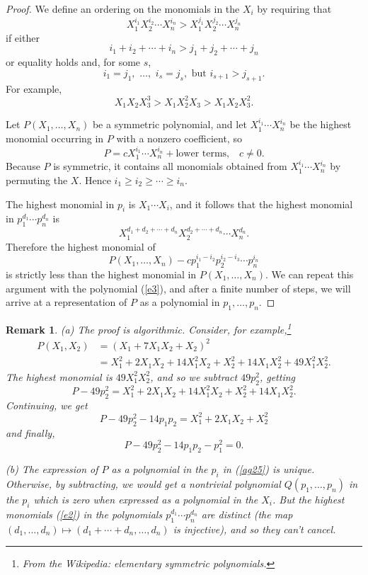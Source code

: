 \documentclass[a4paper,11pt,final,openany]{memoir}
\newtheorem{remark}[X]{Remark}
\theoremstyle{nonumberplain}
\newtheorem{proof}{Proof.}
\begin{document}
\begin{proof}
We define an ordering on the monomials in the $X_{i}$ by requiring that
\[
X_{1}^{i_{1}}X_{2}^{i_{2}}\cdots X_{n}^{i_{n}}>X_{1}^{j_{1}}X_{2}^{j_{2}%
}\cdots X_{n}^{j_{n}}%
\]
if either
\[
i_{1}+i_{2}+\cdots+i_{n}>j_{1}+j_{2}+\cdots+j_{n}%
\]
or equality holds and, for some $s$,
\[
i_{1}=j_{1},\,\,\ldots,\,\,i_{s}=j_{s},\text{\ but }i_{s+1}>j_{s+1}.
\]
For example,
\[
X_{1}X_{2}X_{3}^{3}>X_{1}X_{2}^{2}X_{3}>X_{1}X_{2}X_{3}^{2}.
\]


Let $P(X_{1},\ldots,X_{n})$ be a symmetric polynomial, and let $X_{1}^{i_{1}%
}\cdots X_{n}^{i_{n}}$ be the highest monomial occurring in $P$ with a nonzero
coefficient, so%
\[
P=cX_{1}^{i_{1}}\cdots X_{n}^{i_{n}}+\text{lower terms,}\quad c\neq0.
\]
Because $P$ is symmetric, it contains all monomials obtained from
$X_{1}^{i_{1}}\cdots X_{n}^{i_{n}}$ by permuting the $X$. Hence $i_{1}\geq
i_{2}\geq\cdots\geq i_{n}$.

The highest monomial in $p_{i}$ is $X_{1}\cdots X_{i}$, and it follows that
the highest monomial in $p_{1}^{d_{1}}\cdots p_{n}^{d_{n}}$ is
\begin{equation}
X_{1}^{d_{1}+d_{2}+\cdots+d_{n}}X_{2}^{d_{2}+\cdots+d_{n}}\cdots X_{n}^{d_{n}%
}. \label{e2}%
\end{equation}
Therefore the highest monomial of
\begin{equation}
P(X_{1},\ldots,X_{n})-cp_{1}^{i_{1}-i_{2}}p_{2}^{i_{2}-i_{3}}\cdots
p_{n}^{i_{n}} \label{e3}%
\end{equation}
is strictly less than the highest monomial in $P(X_{1},\ldots,X_{n})$. We can
repeat this argument with the polynomial (\ref{e3}), and after a finite number
of steps, we will arrive at a representation of $P$ as a polynomial in
$p_{1},\ldots,p_{n}$.
\end{proof}

\begin{remark}
\label{ag27a}(a) The proof is algorithmic. Consider, for
example,\footnote{From the Wikipedia: elementary symmetric polynomials.}
\begin{align*}
P(X_{1},X_{2})  &  =(X_{1}+7X_{1}X_{2}+X_{2})^{2}\\
&  =X_{1}^{2}+2X_{1}X_{2}+14X_{1}^{2}X_{2}+X_{2}^{2}+14X_{1}X_{2}^{2}%
+49X_{1}^{2}X_{2}^{2}.
\end{align*}
\noindent The highest monomial is $49X_{1}^{2}X_{2}^{2}$, and so we subtract
$49p_{2}^{2}$, getting{}%
\[
P-49p_{2}^{2}=X_{1}^{2}+2X_{1}X_{2}+14X_{1}^{2}X_{2}+X_{2}^{2}+14X_{1}%
X_{2}^{2}.
\]
Continuing, we get%
\[
P-49p_{2}^{2}-14p_{1}p_{2}=X_{1}^{2}+2X_{1}X_{2}+X_{2}^{2}%
\]
and finally,%
\[
P-49p_{2}^{2}-14p_{1}p_{2}-p_{1}^{2}=0\text{.}%
\]


(b) The expression of $P$ as a polynomial in the $p_{i}$ in (\ref{ag25}) is
unique. Otherwise, by subtracting, we would get a nontrivial polynomial
$Q(p_{1},\ldots,p_{n})$ in the $p_{i}$ which is zero when expressed as a
polynomial in the $X_{i}$. But the highest monomials (\ref{e2}) in the
polynomials $p_{1}^{d_{1}}\cdots p_{n}^{d_{n}}$ are distinct (the map
$(d_{1},\ldots,d_{n})\mapsto(d_{1}+\cdots+d_{n},\ldots,d_{n})$ is injective),
and so they can't cancel.
\end{remark}
\end{document}
